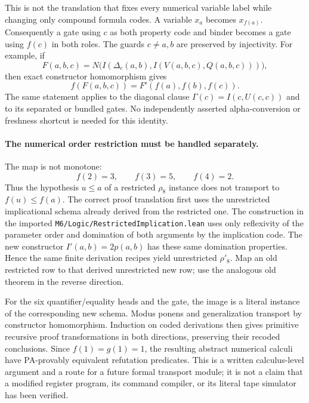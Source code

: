 This is not the translation that fixes every numerical variable label while
changing only compound formula codes. A variable $x_a$ becomes $x_{f(a)}$.
Consequently a gate using $c$ as both property code and binder becomes a
gate using $f(c)$ in both roles. The guards $c\ne a,b$ are preserved by
injectivity. For example, if
\[
 F(a,b,c)=N\bigl(I(\Delta_c(a,b),I(V(a,b,c),Q(a,b,c)))\bigr),
\]
then exact constructor homomorphism gives
\[
 f(F(a,b,c))=F'(f(a),f(b),f(c)).
\]
The same statement applies to the diagonal clause $\Gamma(c)=I(c,U(c,c))$
and to its separated or bundled gates. No independently asserted
alpha-conversion or freshness shortcut is needed for this identity.

\paragraph{The numerical order restriction must be handled separately.}
The map is not monotone:
\[
 f(2)=3,\qquad f(3)=5,\qquad f(4)=2.
\]
Thus the hypothesis $u\le a$ of a restricted $\rho_8$ instance does not
transport to $f(u)\le f(a)$. The correct proof translation first uses the
unrestricted implicational schema already derived from the restricted one.
The construction in the imported
\texttt{M6/Logic/RestrictedImplication.lean} uses only reflexivity of the
parameter order and domination of both arguments by the implication code.
The new constructor $I'(a,b)=2p(a,b)$ has these same domination properties.
Hence the same finite derivation recipes yield unrestricted $\rho'_8$.
Map an old restricted row to that derived unrestricted new row; use the
analogous old theorem in the reverse direction.

For the six quantifier/equality heads and the gate, the image is a literal
instance of the corresponding new schema. Modus ponens and generalization
transport by constructor homomorphism. Induction on coded derivations then
gives primitive recursive proof transformations in both directions,
preserving their recoded conclusions. Since $f(1)=g(1)=1$, the resulting
abstract numerical calculi have PA-provably equivalent refutation
predicates. This is a written calculus-level argument and a route for a
future formal transport module; it is not a claim that a modified register
program, its command compiler, or its literal tape simulator has been
verified.

